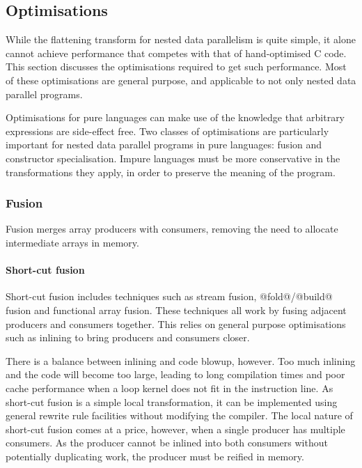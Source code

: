 \subsection{Optimisations}

While the flattening transform for nested data parallelism is quite simple,
it alone cannot achieve performance that competes with that of hand-optimised C code.
This section discusses the optimisations required to get such performance.
Most of these optimisations are general purpose, and applicable to not only nested data parallel programs.

Optimisations for pure languages can make use of the knowledge that arbitrary expressions are side-effect free.
Two classes of optimisations are particularly important for nested data parallel programs in pure languages: fusion and constructor specialisation.
Impure languages must be more conservative in the transformations they apply, in order to preserve the meaning of the program.


\subsubsection{Fusion}

Fusion merges array producers with consumers, removing the need to allocate intermediate arrays in memory.


\paragraph{Short-cut fusion}

Short-cut fusion includes techniques such as stream fusion\cite{coutts2007streamfusion},
@fold@/@build@ fusion\cite{gill1993shortcut}
and functional array fusion\cite{chakravarty2001functional, chakravarty2003approach}.
These techniques all work by fusing adjacent producers and consumers together.
This relies on general purpose optimisations such as inlining to bring producers and consumers closer. 

There is a balance between inlining and code blowup, however.
Too much inlining and the code will become too large, leading to long compilation times and poor cache performance when a loop kernel does not fit in the instruction line.
As short-cut fusion is a simple local transformation, it can be implemented using general rewrite rule facilities\cite{jones2001playingby} without modifying the compiler.
The local nature of short-cut fusion comes at a price, however, when a single producer has multiple consumers.
As the producer cannot be inlined into both consumers without potentially duplicating work, the producer must be reified in memory.

